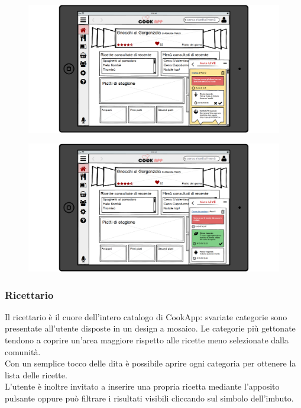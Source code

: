 \begin{figure}[H]
	\centering
	\includegraphics[width=0.95\linewidth]{img/mockup/Live3.png}
\end{figure}
\begin{figure}[H]
	\centering
	\includegraphics[width=0.95\linewidth]{img/mockup/Live4.png}
\end{figure}

\subsubsection{Ricettario}
Il ricettario è il cuore dell'intero catalogo di CookApp: svariate categorie sono presentate all'utente disposte in un design a mosaico. Le categorie più gettonate tendono a coprire un'area maggiore rispetto alle ricette meno selezionate dalla comunità.\\
Con un semplice tocco delle dita è possibile aprire ogni categoria per ottenere la lista delle ricette.\\
L'utente è inoltre invitato a inserire una propria ricetta mediante l'apposito pulsante oppure può filtrare i risultati visibili cliccando sul simbolo dell'imbuto.\\\\


